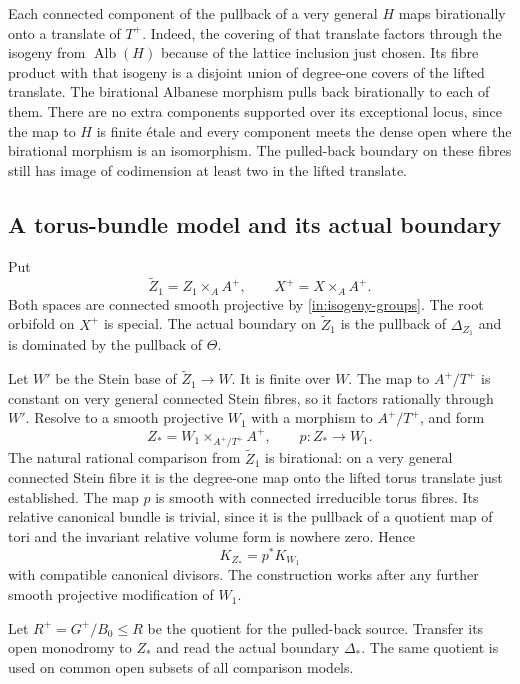 Each connected component of the pullback of a very general $H$
maps birationally onto a translate of $T^+$.  Indeed, the covering
of that translate factors through the isogeny from
$\operatorname{Alb}(H)$ because of the lattice inclusion just
chosen.  Its fibre product with that isogeny is a disjoint union of
degree-one covers of the lifted translate.  The birational Albanese
morphism pulls back birationally to each of them.  There are no extra
components supported over its exceptional locus, since the map to
$H$ is finite \'etale and every component meets the dense open where
the birational morphism is an isomorphism.  The pulled-back boundary
on these fibres still has image of codimension at least two in the
lifted translate.

\subsection{A torus-bundle model and its actual boundary}

Put
\[
 \widetilde Z_1=Z_1\times_A A^+,
 \qquad X^+=X\times_A A^+.
\]
Both spaces are connected smooth projective by
\eqref{in:isogeny-groups}.  The root orbifold on $X^+$ is special.
The actual boundary on $\widetilde Z_1$ is the pullback of
$\Delta_{Z_1}$ and is dominated by the pullback of $\Theta$.

Let $W'$ be the Stein base of $\widetilde Z_1\to W$.  It is finite
over $W$.  The map to $A^+/T^+$ is constant on very general connected
Stein fibres, so it factors rationally through $W'$.  Resolve to a
smooth projective $W_1$ with a morphism to $A^+/T^+$, and form
\begin{equation}\label{in:torus-bundle}
 Z_*=W_1\times_{A^+/T^+}A^+,
 \qquad p:Z_*\longrightarrow W_1.
\end{equation}
The natural rational comparison from $\widetilde Z_1$ is birational:
on a very general connected Stein fibre it is the degree-one map
onto the lifted torus translate just established.  The map $p$ is
smooth with connected irreducible torus fibres.  Its relative canonical
bundle is trivial, since it is the pullback of a quotient map of
tori and the invariant relative volume form is nowhere zero.  Hence
\begin{equation}\label{in:canonical-bundle}
 K_{Z_*}=p^*K_{W_1}
\end{equation}
with compatible canonical divisors.  The construction works after
any further smooth projective modification of $W_1$.

Let $R^+=G^+/B_0\le R$ be the quotient for the pulled-back source.
Transfer its open monodromy to $Z_*$ and read the actual boundary
$\Delta_*$.  The same quotient is used on common open subsets of
all comparison models.

